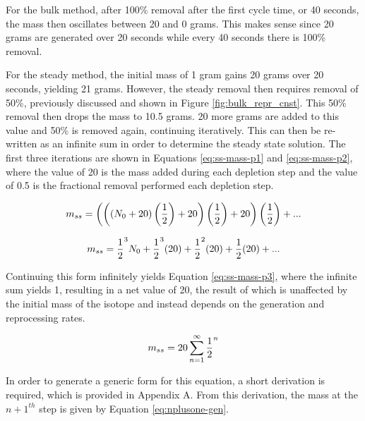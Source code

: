 For the bulk method, after 100\% removal after the first cycle time, or 40 seconds, the mass then oscillates between 20 and 0 grams. This makes sense since 20 grams are generated over 20 seconds while every 40 seconds there is 100\% removal.

For the steady method, the initial mass of 1 gram gains 20 grams over 20 seconds, yielding 21 grams. However, the steady removal then requires removal of 50\%, previously discussed and shown in Figure \ref{fig:bulk_repr_cnst}. This 50\% removal then drops the mass to 10.5 grams. 20 more grams are added to this value and 50\% is removed again, continuing iteratively. This can then be re-written as an infinite sum in order to determine the steady state solution. The first three iterations are shown in Equations \eqref{eq:ss-mass-p1} and \eqref{eq:ss-mass-p2}, where the value of 20 is the mass added during each depletion step and the value of 0.5 is the fractional removal performed each depletion step.


\begin{equation} \hfill
m_{ss} = \left( \left( \left(N_0+20 \right) \left(\frac{1}{2} \right)+20 \right)\left(\frac{1}{2} \right)+20 \right)\left(\frac{1}{2} \right) + ...
\hfill\label{eq:ss-mass-p1} \end{equation}

\begin{equation} \hfill
m_{ss} = \frac{1}{2}^3 N_0 + \frac{1}{2}^3 (20) + \frac{1}{2}^2 (20) + \frac{1}{2} (20) + ...
\hfill\label{eq:ss-mass-p2} \end{equation}

Continuing this form infinitely yields Equation \eqref{eq:ss-mass-p3}, where the infinite sum yields 1, resulting in a net value of 20, the result of which is unaffected by the initial mass of the isotope and instead depends on the generation and reprocessing rates.

\begin{equation} \hfill
m_{ss} = 20 \sum_{n=1}^\infty \frac{1}{2}^n
\hfill\label{eq:ss-mass-p3} \end{equation}

In order to generate a generic form for this equation, a short derivation is required, which is provided in Appendix A. From this derivation, the mass at the $n+1^{th}$ step is given by Equation \eqref{eq:nplusone-gen}.

